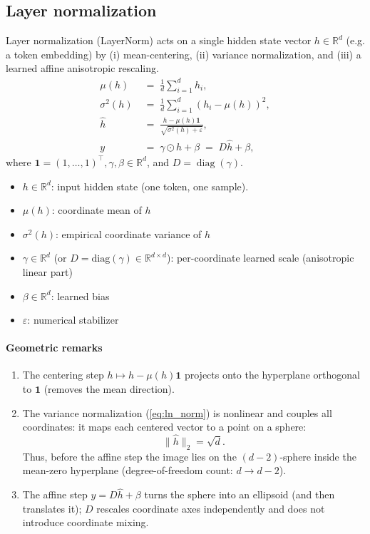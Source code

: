 \documentclass[a4paper,12pt]{article}
\begin{document}
\subsection{Layer normalization}
Layer normalization (LayerNorm) acts on a single hidden state vector \(h\in\mathbb{R}^d\) (e.g. a token embedding) by (i) mean-centering, (ii) variance normalization, and (iii) a learned affine anisotropic rescaling.
\begin{align}
\mu(h) &\;=\; \frac{1}{d}\sum_{i=1}^d h_i, \\
\sigma^2(h) &\;=\; \frac{1}{d}\sum_{i=1}^d (h_i-\mu(h))^2, \\
\widehat{h} &\;=\; \frac{h - \mu(h)\mathbf{1}}{\sqrt{\sigma^2(h)+\varepsilon}}, \label{eq:ln_norm}\\
y &\;=\; \gamma \odot \widehat{h} + \beta \;=\; D\widehat{h} + \beta, \label{eq:ln_affine}
\end{align}
where \(\mathbf{1}=(1,\dots,1)^\top , \gamma, \beta \in\mathbb{R}^d\), and \(D=\operatorname{diag}(\gamma)\).

\begin{itemize}
  \item \(h\in\mathbb{R}^d\): input hidden state (one token, one sample).
  \item \(\mu(h)\): coordinate mean of \(h\)
  \item \(\sigma^2(h)\): empirical coordinate variance of \(h\)
  \item \(\gamma\in\mathbb{R}^d\) (or \(D=\mathrm{diag}(\gamma)\in\mathbb{R}^{d\times d}\)): per-coordinate learned scale (anisotropic linear part)
  \item \(\beta\in\mathbb{R}^d\): learned bias
  \item \(\varepsilon\): numerical stabilizer
\end{itemize}

\paragraph{Geometric remarks}
\begin{enumerate}
  \item The centering step \(h\mapsto h-\mu(h)\mathbf{1}\) projects onto the hyperplane orthogonal to \(\mathbf1\) (removes the mean direction).
  \item The variance normalization (\ref{eq:ln_norm}) is nonlinear and couples all coordinates: it maps each centered vector to a point on a sphere:
  \[
    \lVert \widehat{h}\rVert_2 = \sqrt{d}.
  \]
  Thus, before the affine step the image lies on the \((d-2)\)-sphere inside the mean-zero hyperplane (degree-of-freedom count: \(d\to d-2\)).
  \item The affine step \(y=D\widehat{h}+\beta\) turns the sphere into an ellipsoid (and then translates it); \(D\) rescales coordinate axes independently and does not introduce coordinate mixing.
\end{enumerate}
\end{document}
